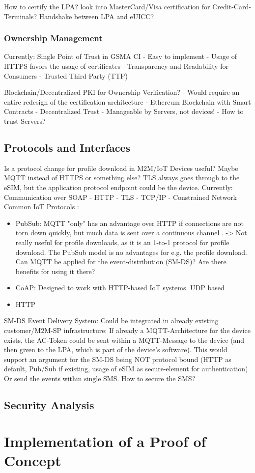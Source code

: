 How to certify the LPA? look into MasterCard/Visa certification for Credit-Card-Terminals? Handshake between LPA and eUICC?

\subsubsection{Ownership Management}
Currently: Single Point of Trust in GSMA CI
 - Easy to implement
 - Usage of HTTPS favors the usage of certificates
 - Transparency and Readability for Consumers
 - Trusted Third Party (TTP)

Blockchain/Decentralized PKI for Ownership Verification?
 - Would require an entire redesign of the certification architecture
 - Ethereum Blockchain with Smart Contracts
 - Decentralized Trust
 - Manageable by Servers, not devices!
 - How to trust Servers?


\subsection{Protocols and Interfaces}

Is a protocol change for profile download in M2M/IoT Devices useful? Maybe MQTT instead of HTTPS or something else?
TLS always goes through to the eSIM, but the application protocol endpoint could be the device.
Currently: Communication over SOAP - HTTP - TLS - TCP/IP - Constrained Network
Common IoT Protocols :
\begin{itemize}
    \item PubSub: MQTT "only" has an advantage over HTTP if connections are not torn down quickly, but much data is sent over a continuous channel \parencite{Google:HTTPvsMQTT}. -> Not really useful for profile downloads, as it is an 1-to-1 protocol for profile download. The PubSub model is no advantages for e.g. the profile download. 
    Can MQTT be applied for the event-distribution (SM-DS)? Are there benefits for using it there?
    \item CoAP: Designed to work with HTTP-based IoT systems. UDP based 
    \item HTTP
\end{itemize}

SM-DS Event Delivery System: Could be integrated in already existing customer/M2M-SP infrastructure: If already a MQTT-Architecture for the device exists, the AC-Token could be sent within a MQTT-Message to the device (and then given to the LPA, which is part of the device's software). This would support an argument for the SM-DS being NOT protocol bound (HTTP as default, Pub/Sub if existing, usage of eSIM as secure-element for authentication)
Or send the events within single SMS. How to secure the SMS?

\subsection{Security Analysis}

\section{Implementation of a Proof of Concept}